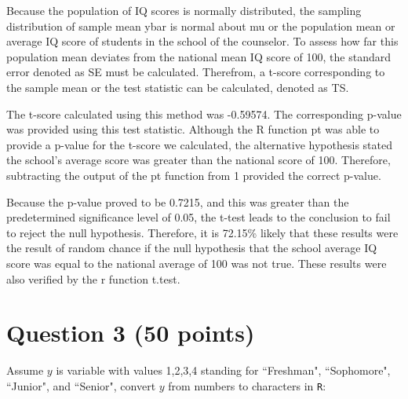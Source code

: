 \documentclass[12pt,letterpaper]{article}
\begin{document}
\vspace{.5cm}

\noindent Because the population of IQ scores is normally distributed, the sampling distribution of sample mean ybar is normal about mu or the population mean or average IQ score of students in the school of the counselor. To assess how far this population mean deviates from the national mean IQ score of 100, the standard error denoted as SE must be calculated. Therefrom, a t-score corresponding to the sample mean or the test statistic can be calculated, denoted as TS.

\vspace{.5cm}
  
\vspace{.5cm}

\noindent The t-score calculated using this method was -0.59574. The corresponding p-value was provided using this test statistic. Although the R function pt was able to provide a p-value for the t-score we calculated, the alternative hypothesis stated the school's average score was greater than the national score of 100. Therefore, subtracting the output of the pt function from 1 provided the correct p-value.

\vspace{.5cm}
  
\vspace{.5cm}

\noindent Because the p-value proved to be 0.7215, and this was greater than the predetermined significance level of 0.05, the t-test leads to the conclusion to fail to reject the null hypothesis. Therefore, it is 72.15\% likely that these results were the result of random chance if the null hypothesis that the school average IQ score was equal to the national average of 100 was not true. These results were also verified by the r function t.test.

\vspace{1cm}
	\section*{Question 3 (50 points)}
Assume $y$ is variable with values 1,2,3,4 standing for ``Freshman", ``Sophomore", ``Junior", and ``Senior", convert $y$ from numbers to characters in \texttt{R}:
\vspace{.5cm}
  
\vspace{.5cm}
\end{document}
